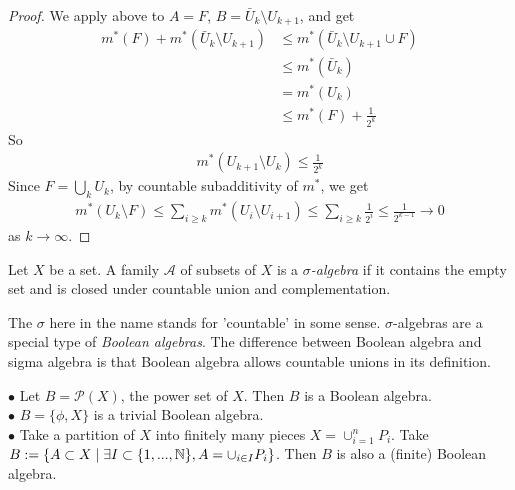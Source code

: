 \documentclass[a4paper]{article}
\begin{document}
\begin{proof}
We apply above to $A=F$, $B=\bar{U}_k \setminus U_{k+1}$, and get
\begin{equation*}
\begin{aligned}
m^*(F)+m^*(\bar{U}_k \setminus U_{k+1}) &\leq m^*(\bar{U}_k \setminus U_{k+1} \cup F)\\
&\leq m^*(\bar{U}_k)\\
&= m^*(U_k)\\
&\leq m^*(F)+\frac{1}{2^k}
\end{aligned}
\end{equation*}
So
\begin{equation*}
\begin{aligned}
m^*(U_{k+1}\setminus U_k) \leq \frac{1}{2^k}
\end{aligned}
\end{equation*}
Since $F=\bigcup_k U_k$, by countable subadditivity of $m^*$, we get
\begin{equation*}
\begin{aligned}
m^*(U_k \setminus F) \leq \sum_{i \geq k} m^*(U_i \setminus U_{i+1}) \leq \sum_{i \geq k} \frac{1}{2^i} \leq \frac{1}{2^{k-1}} \to 0
\end{aligned}
\end{equation*}
as $k \to \infty$.

\end{proof}

\begin{defi}
Let $X$ be a set. A family $\mathcal{A}$ of subsets of $X$ is a \emph{$\sigma$-algebra} if it contains the empty set and is closed under countable union and complementation.
\end{defi}

The $\sigma$ here in the name stands for 'countable' in some sense. $\sigma$-algebras are a special type of \emph{Boolean algebras}. The difference between Boolean algebra and sigma algebra is that Boolean algebra allows countable unions in its definition.

\begin{eg}
$\bullet$ Let $B=\mathcal{P}(X)$, the power set of $X$. Then $B$ is a Boolean algebra.\\
$\bullet$ $B=\{\phi,X\}$ is a trivial Boolean algebra.\\
$\bullet$ Take a partition of $X$ into finitely many pieces $X=\cup_{i=1}^n P_i$. Take $B:=\{A \subset X \mid \exists I\subset \{1,...,\mathbb{N}\}, A= \cup_{i \in I} P_i\}$. Then $B$ is also a (finite) Boolean algebra.
\end{eg}
\end{document}

